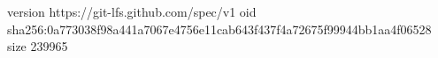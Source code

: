 version https://git-lfs.github.com/spec/v1
oid sha256:0a773038f98a441a7067e4756e11cab643f437f4a72675f99944bb1aa4f06528
size 239965
